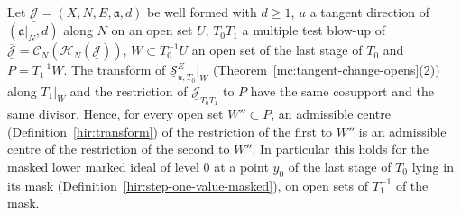 \begin{lemma}
\label{mc:contact-admissible}
\leanok
Let \(\underline{\mathcal J}=(X,N,E,\mathfrak a,d)\) be well formed with \(d\ge1\), \(u\) a tangent direction of \((\mathfrak a|_N,d)\) along \(N\) on an open set \(U\),
\(T_0T_1\) a multiple test blow-up of \(\overline{\underline{\mathcal J}}=\mathcal C_N(\mathcal H_N(\underline{\mathcal J}))\), \(W\subset T_0^{-1}U\) an open set of the last stage of
\(T_0\) and \(P=T_1^{-1}W\). The transform of \(\underline{\mathcal S}^E_{u,T_0}|_W\) (Theorem~\ref{mc:tangent-change-opens}(2)) along \(T_1|_W\) and the restriction of
\(\overline{\underline{\mathcal J}}_{T_0T_1}\) to \(P\) have the same cosupport and the same divisor. Hence, for every open set \(W''\subset P\), an admissible centre
(Definition~\ref{hir:transform}) of the restriction of the first to \(W''\) is an admissible centre of the restriction of the second to \(W''\). In particular this holds for the
masked lower marked ideal of level \(0\) at a point \(y_0\) of the last stage of \(T_0\) lying in its mask (Definition~\ref{hir:step-one-value-masked}), on open sets of
\(T_1^{-1}\) of the mask.
\end{lemma}
